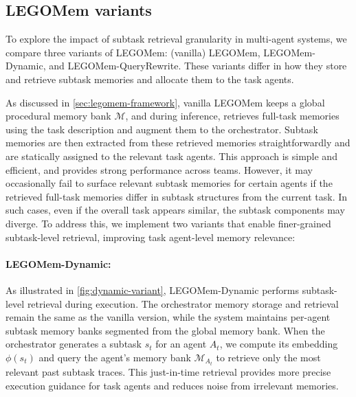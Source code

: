 \documentclass[sigconf]{aamas}
\newcommand{\legomem}{LEGOMem}
\newcommand{\dynalegomem}{LEGOMem-Dynamic}
\newcommand{\queryrewritelegomem}{LEGOMem-QueryRewrite}
\begin{document}
\subsection{\legomem{} variants}
\label{sec:legomem-variants}

To explore the impact of subtask retrieval granularity in multi-agent systems, we compare three variants of \legomem{}: (vanilla) \legomem{}, \dynalegomem{}, and \queryrewritelegomem{}. 
These variants differ in how they store and retrieve subtask memories and allocate them to the task agents.

As discussed in \ref{sec:legomem-framework}, vanilla \legomem{} keeps a global procedural memory bank $\mathcal{M}$, and during inference, retrieves full-task memories using the task description and augment them to the orchestrator. Subtask memories are then extracted from these retrieved memories straightforwardly and are statically assigned to the relevant task agents. This approach is simple and efficient, and provides strong performance across teams. However, it may occasionally fail to surface relevant subtask memories for certain agents if the retrieved full-task memories differ in subtask structures from the current task. In such cases, even if the overall task appears similar, the subtask components may diverge. To address this, we implement two variants
that enable finer-grained subtask-level retrieval, improving task agent-level memory relevance:

\paragraph{\dynalegomem{}:}
As illustrated in \autoref{fig:dynamic-variant}, \dynalegomem{} performs subtask-level retrieval during execution. The orchestrator memory storage and retrieval remain the same as the vanilla version, while the system maintains per-agent subtask memory banks segmented from the global memory bank. When the orchestrator generates a subtask $s_t$ for an agent $A_t$, we compute its embedding $\phi(s_t)$ and query the agent’s memory bank $\mathcal{M}_{A_t}$ to retrieve only the most relevant past subtask traces. This just-in-time retrieval provides more precise execution guidance for task agents and reduces noise from irrelevant memories.
\end{document}
